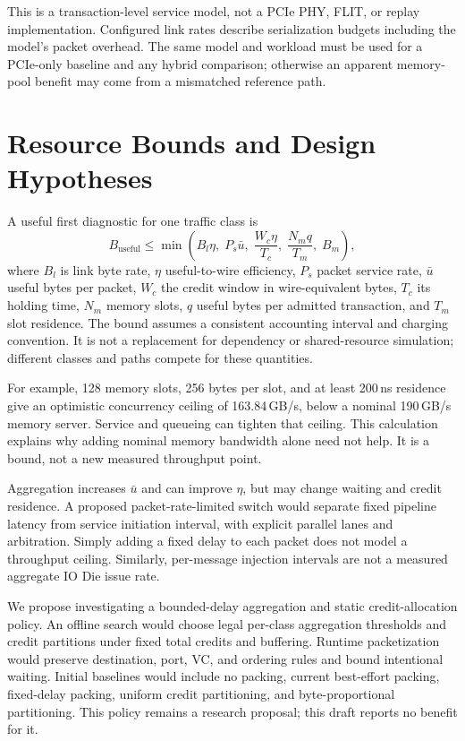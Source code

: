\documentclass[conference]{IEEEtran}
\begin{document}
This is a transaction-level service model, not a PCIe PHY, FLIT, or replay implementation. Configured link rates describe serialization budgets including the model's packet overhead. The same model and workload must be used for a PCIe-only baseline and any hybrid comparison; otherwise an apparent memory-pool benefit may come from a mismatched reference path.





\section{Resource Bounds and Design Hypotheses}
A useful first diagnostic for one traffic class is
\begin{equation}
 B_{\mathrm{useful}}\leq\min\left(B_l\eta,\;P_s\bar u,\;\frac{W_c\eta}{T_c},\;\frac{N_m q}{T_m},\;B_m\right),
\label{eq:bound}
\end{equation}
where $B_l$ is link byte rate, $\eta$ useful-to-wire efficiency, $P_s$ packet service rate, $\bar u$ useful bytes per packet, $W_c$ the credit window in wire-equivalent bytes, $T_c$ its holding time, $N_m$ memory slots, $q$ useful bytes per admitted transaction, and $T_m$ slot residence. The bound assumes a consistent accounting interval and charging convention. It is not a replacement for dependency or shared-resource simulation; different classes and paths compete for these quantities.

For example, 128 memory slots, 256 bytes per slot, and at least 200\,ns residence give an optimistic concurrency ceiling of 163.84\,GB/s, below a nominal 190\,GB/s memory server. Service and queueing can tighten that ceiling. This calculation explains why adding nominal memory bandwidth alone need not help. It is a bound, not a new measured throughput point.

Aggregation increases $\bar u$ and can improve $\eta$, but may change waiting and credit residence. A proposed packet-rate-limited switch would separate fixed pipeline latency from service initiation interval, with explicit parallel lanes and arbitration. Simply adding a fixed delay to each packet does not model a throughput ceiling. Similarly, per-message injection intervals are not a measured aggregate IO Die issue rate.

We propose investigating a bounded-delay aggregation and static credit-allocation policy. An offline search would choose legal per-class aggregation thresholds and credit partitions under fixed total credits and buffering. Runtime packetization would preserve destination, port, VC, and ordering rules and bound intentional waiting. Initial baselines would include no packing, current best-effort packing, fixed-delay packing, uniform credit partitioning, and byte-proportional partitioning. This policy remains a research proposal; this draft reports no benefit for it.
\end{document}
